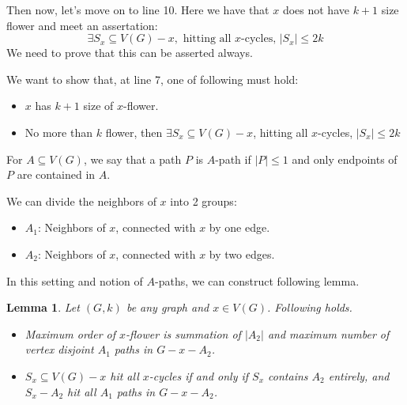 \documentclass[12pt, a4paper, openany, twoside]{book}
\newtheorem{lem}[thm]{Lemma}
\theoremstyle{definition}
\theoremstyle{remark}
\theoremstyle{plain}
\numberwithin{equation}{section}
\begin{document}
Then now, let's move on to line 10. Here we have that $x$ does not have $k+1$ size flower and meet an assertation: 
\[\exists S_x \subseteq V(G) - x, \text{ hitting all $x$-cycles, $|S_x| \leq 2k$}\]
We need to prove that this can be asserted always. 

\begin{tcolorbox}[colback=yellow!10!white,colframe=red!75!black,title=Want To Show]

We want to show that, at line 7, one of following must hold: 
\begin{itemize}
    \item $x$ has $k+1$ size of $x$-flower. 
    \item No more than $k$ flower, then $\exists S_x \subseteq V(G) - x$, hitting all $x$-cycles, $|S_x| \leq 2k$
\end{itemize}

\end{tcolorbox}

\begin{tcolorbox}[colback=yellow!10!white,colframe=brown!75!black,title=A-path]

For $A \subseteq V(G)$, we say that a path $P$ is $A$-path if $|P| \leq 1$ and only endpoints of $P$ are contained in $A$. 

\end{tcolorbox}

We can divide the neighbors of $x$ into 2 groups: 
\begin{itemize}
    \item $A_1$: Neighbors of $x$, connected with $x$ by one edge. 
    \item $A_2$: Neighbors of $x$, connected with $x$ by two edges. 
\end{itemize}
In this setting and notion of $A$-paths, we can construct following lemma. 

\begin{lem}
Let $(G, k)$ be any graph and $x \in V(G)$. Following holds.
\begin{itemize}
    \item Maximum order of $x$-flower is summation of $|A_2|$ and maximum number of vertex disjoint $A_1$ paths in $G - x - A_2$. 
    \item $S_x \subseteq V(G) - x$ hit all $x$-cycles if and only if $S_x$ contains $A_2$ entirely, and $S_x - A_2$ hit all $A_1$ paths in $G - x - A_2$. 
\end{itemize}

\end{lem}
\end{document}
